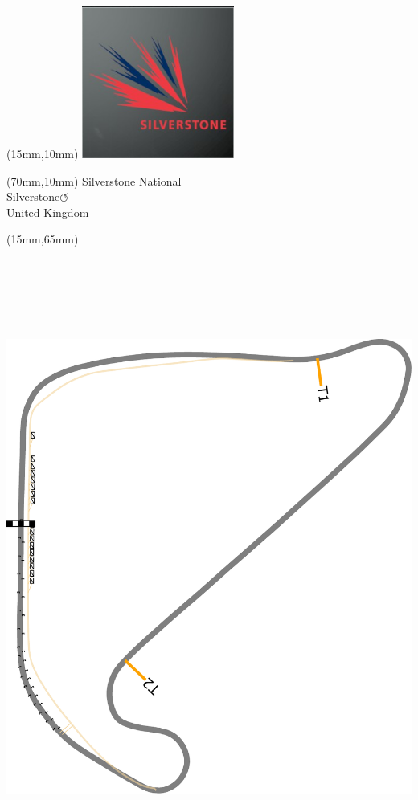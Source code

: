 \null\newpage
\begin{textblock*}{50mm}(15mm,10mm)%
\includegraphics[width=50mm]{LG/2015-05-20_00094.png}
\end{textblock*}
\begin{textblock*}{130mm}(70mm,10mm)%
{\fontsize{20}{20}\selectfont Silverstone National\\}
{\fontsize{16}{16}\selectfont Silverstone\hfill \huge$\circlearrowleft$\\}
{\fontsize{12}{12}\selectfont United Kingdom\\}
\end{textblock*}
\begin{textblock*}{185mm}(15mm,65mm)%
\centering
\mbox{\includegraphics[width=185mm,height=210mm,keepaspectratio]{PT/SINA.pdf}}
\end{textblock*}
